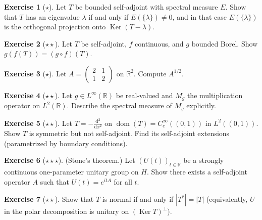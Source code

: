 \documentclass[a4paper,12pt]{book}
\DeclareMathOperator{\Ker}{Ker}
\DeclareMathOperator{\dom}{dom}
\newcommand{\R}{\mathbb{R}}
\newcommand{\dd}{\mathrm{d}}
\newcommand{\abs}[1]{\left| #1 \right|}
\theoremstyle{definition}
\newtheorem{exercise}{Exercise}[chapter]
\theoremstyle{plain}
\theoremstyle{remark}
\begin{document}
\begin{exercise}[$\star$]\label{exo:spectral-projection}
Let $T$ be bounded self-adjoint with spectral measure $E$. Show that
$T$ has an eigenvalue $\lambda$ if and only if $E(\{\lambda\}) \ne 0$, and in
that case $E(\{\lambda\})$ is the orthogonal projection onto $\Ker(T - \lambda)$.
\end{exercise}

\begin{exercise}[$\star\star$]\label{exo:func-calc-composition}
Let $T$ be self-adjoint, $f$ continuous, and $g$ bounded Borel. Show $g(f(T)) = (g \circ f)(T)$.
\end{exercise}

\begin{exercise}[$\star$]\label{exo:positive-sqrt-compute}
Let $A = \begin{pmatrix} 2 & 1 \\ 1 & 2 \end{pmatrix}$ on $\R^2$. Compute $A^{1/2}$.
\end{exercise}

\begin{exercise}[$\star\star$]\label{exo:spectral-theorem-multiplication}
Let $g \in L^\infty(\R)$ be real-valued and $M_g$ the multiplication operator on
$L^2(\R)$. Describe the spectral measure of $M_g$ explicitly.
\end{exercise}

\begin{exercise}[$\star\star$]\label{exo:unbounded-sa-extension}
Let $T = -\frac{\dd^2}{\dd x^2}$ on $\dom(T) = C_c^\infty((0,1))$ in $L^2((0,1))$.
Show $T$ is symmetric but not self-adjoint. Find its self-adjoint extensions
(parametrized by boundary conditions).
\end{exercise}

\begin{exercise}[$\star\star\star$]\label{exo:stone-theorem}
(Stone's theorem.) Let $(U(t))_{t \in \R}$ be a strongly continuous one-parameter
unitary group on $H$. Show there exists a self-adjoint operator $A$ such that
$U(t) = e^{itA}$ for all $t$.
\end{exercise}

\begin{exercise}[$\star\star$]\label{exo:polar-normal}
Show that $T$ is normal if and only if $\abs{T^*} = \abs{T}$ (equivalently,
$U$ in the polar decomposition is unitary on $(\Ker T)^\perp$).
\end{exercise}
\end{document}
